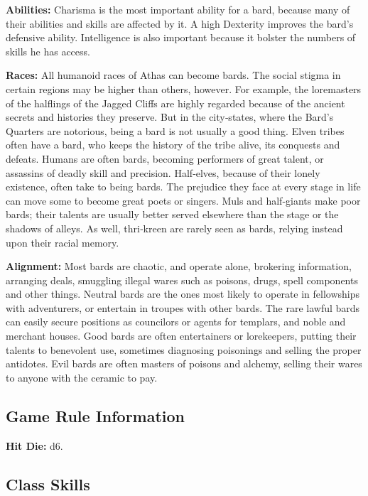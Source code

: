 \documentclass[10pt,a4paper,twocolumn]{d20}
\begin{document}
{\textbf{Abilities:} Charisma is the most important ability for a bard, because many of their abilities and skills are affected by it. A high Dexterity improves the bard’s defensive ability. Intelligence is also important because it bolster the numbers of skills he has access.

\textbf{Races:} All humanoid races of Athas can become bards. The social stigma in certain regions may be higher than others, however. For example, the loremasters of the halflings of the Jagged Cliffs are highly regarded because of the ancient secrets and histories they preserve. But in the city‐states, where the Bard’s Quarters are notorious, being a bard is not usually a good thing. Elven tribes often have a bard, who keeps the history of the tribe alive, its conquests and defeats. Humans are often bards, becoming performers of great talent, or assassins of deadly skill and precision. Half‐elves, because of their lonely existence, often take to being bards. The prejudice they face at every stage in life can move some to become great poets or singers. Muls and half‐giants make poor bards; their talents are usually better served elsewhere than the stage or the shadows of alleys. As well, thri‐kreen are rarely seen as bards, relying instead upon their racial memory.

\textbf{Alignment:} Most bards are chaotic, and operate alone, brokering information, arranging deals, smuggling illegal wares such as poisons, drugs, spell components and other things. Neutral bards are the ones most likely to operate in fellowships with adventurers, or entertain in troupes with other bards. The rare lawful bards can easily secure positions as councilors or agents for templars, and noble and merchant houses. Good bards are often entertainers or lorekeepers, putting their talents to benevolent use, sometimes diagnosing poisonings and selling the proper antidotes. Evil bards are often masters of poisons and alchemy, selling their wares to anyone with the ceramic to pay.

\subsection{Game Rule Information}

\textbf{Hit Die:} d6.

\subsection{Class Skills}

}
\end{document}
